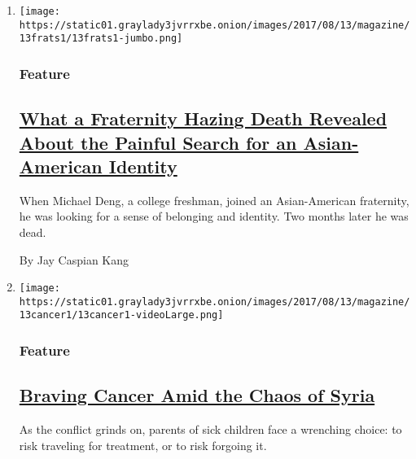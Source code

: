 \begin{enumerate}
\def\labelenumi{\arabic{enumi}.}
\item
  \texttt{[image: https://static01.graylady3jvrrxbe.onion/images/2017/08/13/magazine/13frats1/13frats1-jumbo.png]}

  \hypertarget{feature}{%
  \subsubsection{Feature}\label{feature}}

  \hypertarget{what-a-fraternity-hazing-death-revealed-about-the-painful-search-for-an-asian-american-identity}{%
  \subsection{\texorpdfstring{\href{/2017/08/09/magazine/what-a-fraternity-hazing-death-revealed-about-the-painful-search-for-an-asian-american-identity.html}{What
  a Fraternity Hazing Death Revealed About the Painful Search for an
  Asian-American
  Identity}}{What a Fraternity Hazing Death Revealed About the Painful Search for an Asian-American Identity}}\label{what-a-fraternity-hazing-death-revealed-about-the-painful-search-for-an-asian-american-identity}}

  When Michael Deng, a college freshman, joined an Asian-American
  fraternity, he was looking for a sense of belonging and identity. Two
  months later he was dead.

  By Jay Caspian Kang
\item
  \texttt{[image: https://static01.graylady3jvrrxbe.onion/images/2017/08/13/magazine/13cancer1/13cancer1-videoLarge.png]}

  \hypertarget{feature-1}{%
  \subsubsection{Feature}\label{feature-1}}

  \hypertarget{braving-cancer-amid-the-chaos-of-syria}{%
  \subsection{\texorpdfstring{\href{/2017/08/08/magazine/braving-cancer-amid-the-chaos-of-syria.html}{Braving
  Cancer Amid the Chaos of
  Syria}}{Braving Cancer Amid the Chaos of Syria}}\label{braving-cancer-amid-the-chaos-of-syria}}

  As the conflict grinds on, parents of sick children face a wrenching
  choice: to risk traveling for treatment, or to risk forgoing it.


\end{enumerate}
